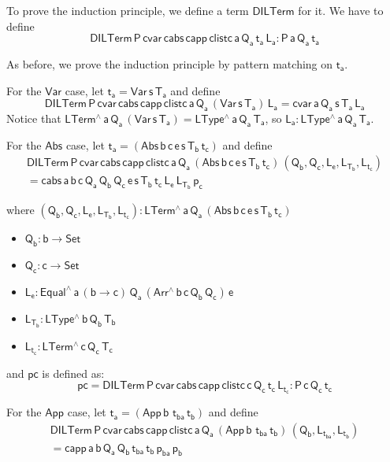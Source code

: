 \documentclass[acmsmall,screen,review,anonymous]{acmart}
\theoremstyle{definition}
\begin{document}
To prove the induction principle, we define a term $\mathsf{DILTerm}$ for it. We have to define 
\[ 
\mathsf{DILTerm \, P\, cvar \, cabs\, capp\, clistc \, a\, Q_a\, t_a\, L_a : P\, a\, Q_a\, t_a}
\]

As before, we prove the induction principle by pattern matching on $\mathsf{t_a}$. 

For the $\mathsf{Var}$ case, let $\mathsf{t_a = Var\, s\, T_a}$ and define
\[
  \mathsf{DILTerm \, P\, cvar \, cabs\, capp\, clistc \, a\, Q_a\, (Var\,s\,T_a) \, L_a = cvar \, a\, Q_a\, s\, T_a\, L_a }
\]
Notice that $\mathsf{LTerm^{\wedge}\, a\, Q_a\, (Var\,s\,T_a) = LType^{\wedge}\,a\,Q_a\,T_a}$, so 
$\mathsf{L_a : LType^{\wedge}\,a\,Q_a\,T_a}$.


For the $\mathsf{Abs}$ case, let $\mathsf{t_a = (Abs \,b \,c \, e \,s \,T_b \, t_c)} $ and define
\begin{multline*}
  \mathsf{DILTerm \, P\, cvar \, cabs\, capp\, clistc \, a\, Q_a\, (Abs \,b \,c \,e \,s \,T_b \, t_c) \, (Q_b , Q_c , L_e, L_{T_b}, L_{t_c})} \\
  \mathsf{= cabs\,a\,b\,c\, Q_a\, Q_b\, Q_c\, e\, s\, T_b\, t_c\, L_e\, L_{T_b}\, p_c}
\end{multline*}


where $\mathsf{(Q_b , Q_c , L_e, L_{T_b}, L_{t_c}) : LTerm^{\wedge}\, a\, Q_a\, (Abs \,b \,c \, e \,s \,T_b \, t_c)}$
\begin{itemize}
  \item $\mathsf{Q_b : b \to Set}$
  \item $\mathsf{Q_c : c \to Set}$
  \item $\mathsf{L_e : Equal^{\wedge} \, a\, (b \to c)\, Q_a\, (Arr^{\wedge} \, b\, c\, Q_b \, Q_c) \, e}$
  \item $\mathsf{L_{T_b}: LType^{\wedge} \, b\, Q_b\, T_b}$
  \item $\mathsf{L_{t_c}: LTerm^{\wedge} \, c\, Q_c\, T_c}$
\end{itemize}

and $\mathsf{pc}$ is defined as:
\[
  \mathsf{pc =  DILTerm\,P\,cvar\,cabs \,capp \,clistc\, c\, Q_c\, t_c\, L_{t_c}  : P \, c\, Q_c \, t_c }
\]

For the $\mathsf{App}$ case, let $\mathsf{t_a = (App \,b \,\,t_{ba} \, t_b)} $ and define
\begin{multline*}
  \mathsf{DILTerm \, P\, cvar \, cabs\, capp\, clistc \, a\, Q_a\,  (App \,b \,\,t_{ba} \, t_b)\, (Q_b , L_{t_{ba}}, L_{t_b})} \\
  \mathsf{= capp\,a\,b\,Q_a\, Q_b\, t_{ba}\, t_b\, p_{ba} \, p_b}
\end{multline*}
\end{document}
